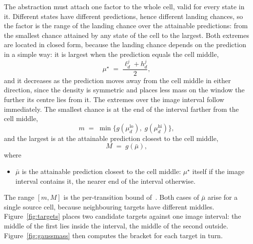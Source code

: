 \documentclass[11pt,a4paper]{article}
\theoremstyle{plain}
\theoremstyle{remark}
\begin{document}
	The abstraction must attach one factor to the whole cell, valid for every state in it. Different states have different predictions, hence
	different landing chances, so the factor is the range of the landing
	chance over the attainable predictions: from the smallest chance
	attained by any state of the cell to the largest. Both extremes are
	located in closed form, because the landing chance depends on the
	prediction in a simple way: it is largest when the prediction equals
	the cell middle,
	\begin{equation}
		\mu^\star \;=\; \frac{\ell^j_d + h^j_d}{2},
		\label{eq:peak}
	\end{equation}
	and it decreases as the prediction moves away from the cell middle in
	either direction, since the density is symmetric and places less mass
	on the window the further its centre lies from it. The extremes over
	the image interval follow immediately. The smallest chance is at the
	end of the interval farther from the cell middle,
	\begin{equation}
		m \;=\; \min\bigl\{g(\mu_d^{\text{lo}}),\; g(\mu_d^{\text{hi}})\bigr\},
		\label{eq:mlo}
	\end{equation}
	and the largest is at the attainable prediction closest to the cell
	middle,
	\begin{equation}
		M \;=\; g(\bar\mu),
		\label{eq:Mhi}
	\end{equation}
	where
	\begin{itemize}
		\item $\bar\mu$ is the attainable prediction closest to the cell
		middle: $\mu^\star$ itself if the image interval contains it, the
		nearer end of the interval otherwise.
	\end{itemize}
	
	
	The range $[m, M]$ is the per-transition bound
	of~\cite[Eq.~3.11]{Soudjani2013}. Both cases of $\bar\mu$ arise for a
	single source cell, because neighbouring targets have different
	middles. Figure~\ref{fig:targets} places two candidate targets
	against one image interval: the middle of the first lies inside the
	interval, the middle of the second outside.
	Figure~\ref{fig:gaussmass} then computes the bracket for each target
	in turn.
	
\end{document}
